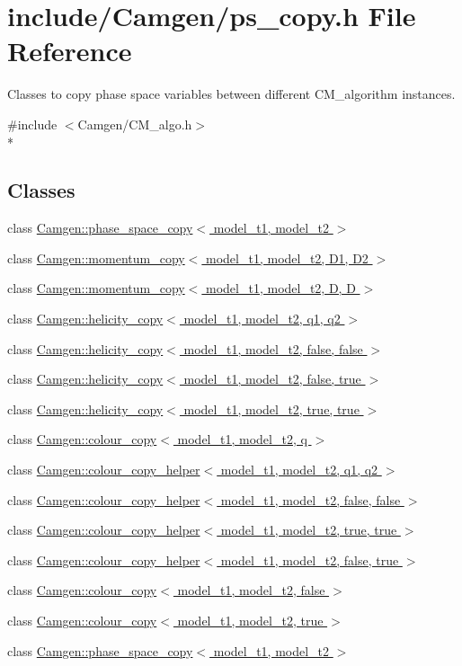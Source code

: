 \hypertarget{a00712}{\section{include/\-Camgen/ps\-\_\-copy.h File Reference}
\label{a00712}
}


Classes to copy phase space variables between different C\-M\-\_\-algorithm instances.  


{\ttfamily \#include $<$Camgen/\-C\-M\-\_\-algo.\-h$>$}\\*
\subsection*{Classes}
\begin{DoxyCompactItemize}
\item 
class \hyperlink{a00412}{Camgen\-::phase\-\_\-space\-\_\-copy$<$ model\-\_\-t1, model\-\_\-t2 $>$}
\item 
class \hyperlink{a00374}{Camgen\-::momentum\-\_\-copy$<$ model\-\_\-t1, model\-\_\-t2, D1, D2 $>$}
\item 
class \hyperlink{a00375}{Camgen\-::momentum\-\_\-copy$<$ model\-\_\-t1, model\-\_\-t2, D, D $>$}
\item 
class \hyperlink{a00262}{Camgen\-::helicity\-\_\-copy$<$ model\-\_\-t1, model\-\_\-t2, q1, q2 $>$}
\item 
class \hyperlink{a00263}{Camgen\-::helicity\-\_\-copy$<$ model\-\_\-t1, model\-\_\-t2, false, false $>$}
\item 
class \hyperlink{a00264}{Camgen\-::helicity\-\_\-copy$<$ model\-\_\-t1, model\-\_\-t2, false, true $>$}
\item 
class \hyperlink{a00265}{Camgen\-::helicity\-\_\-copy$<$ model\-\_\-t1, model\-\_\-t2, true, true $>$}
\item 
class \hyperlink{a00071}{Camgen\-::colour\-\_\-copy$<$ model\-\_\-t1, model\-\_\-t2, q $>$}
\item 
class \hyperlink{a00074}{Camgen\-::colour\-\_\-copy\-\_\-helper$<$ model\-\_\-t1, model\-\_\-t2, q1, q2 $>$}
\item 
class \hyperlink{a00075}{Camgen\-::colour\-\_\-copy\-\_\-helper$<$ model\-\_\-t1, model\-\_\-t2, false, false $>$}
\item 
class \hyperlink{a00077}{Camgen\-::colour\-\_\-copy\-\_\-helper$<$ model\-\_\-t1, model\-\_\-t2, true, true $>$}
\item 
class \hyperlink{a00076}{Camgen\-::colour\-\_\-copy\-\_\-helper$<$ model\-\_\-t1, model\-\_\-t2, false, true $>$}
\item 
class \hyperlink{a00072}{Camgen\-::colour\-\_\-copy$<$ model\-\_\-t1, model\-\_\-t2, false $>$}
\item 
class \hyperlink{a00073}{Camgen\-::colour\-\_\-copy$<$ model\-\_\-t1, model\-\_\-t2, true $>$}
\item 
class \hyperlink{a00412}{Camgen\-::phase\-\_\-space\-\_\-copy$<$ model\-\_\-t1, model\-\_\-t2 $>$}
\end{DoxyCompactItemize}
